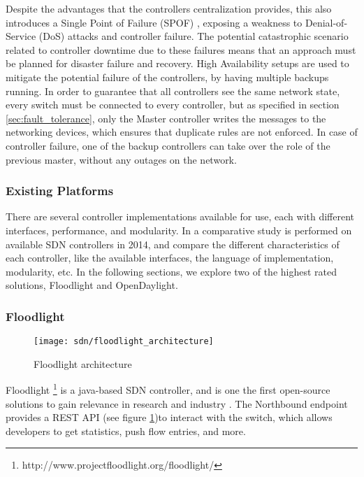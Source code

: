 \begin {enumerate}
\begin{enumerate}
\par Despite the advantages that the controllers centralization provides, this also introduces a Single Point of Failure (SPOF) \cite{phemius_disco:_2014}, exposing
a weakness to Denial-of-Service (DoS) attacks and controller failure. The potential catastrophic scenario related to controller downtime due to these
failures means that an approach must be planned for disaster failure and recovery. High Availability setups are used to mitigate the potential failure of
the controllers, by having multiple backups running. In order to guarantee that all controllers see the same network state, every switch must be connected to 
every controller, but as specified in section \ref{sec:fault_tolerance}, only the Master controller writes the messages to the networking devices, which
ensures that duplicate rules are not enforced. In case of controller failure, one of the backup controllers can take over the role of the previous master,
without any outages on the network.

\subsubsection{Existing Platforms}

There are several controller implementations available for use, each with different interfaces, performance, and modularity. In \cite{khondoker_feature-based_2014} a
comparative study is performed on available SDN controllers in 2014, and compare the different characteristics of each controller, like the available
interfaces, the language of implementation, modularity, etc. In the following sections, we explore two of the highest rated solutions, Floodlight and
OpenDaylight.

\subsubsection {Floodlight} \label{chap:flood}

\begin{figure}[H]
  \centering
  \texttt{[image: sdn/floodlight\_architecture]}\label{fig:flood_arch}
  \caption {Floodlight architecture \cite{project_floodlight_floodlight_2017}}
  \label{fig:flood_arch}
\end{figure}

Floodlight \footnote{http://www.projectfloodlight.org/floodlight/} is a java-based SDN controller, and is one the first open-source solutions to gain relevance in
research and industry \cite{berde_onos:_2014}. The Northbound endpoint provides a REST API (see figure \ref{fig:flood_arch})to interact with the switch, which
allows developers to get statistics, push flow entries, and more. 


\end{enumerate}
\end{enumerate}
